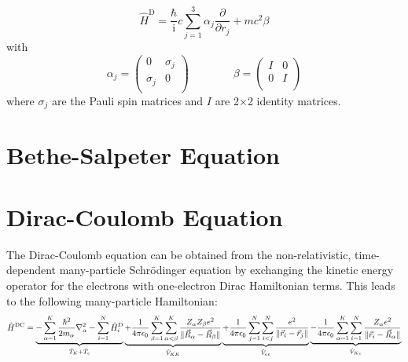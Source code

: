 \documentclass[9pt]{report}
\begin{document}
\begin{equation}
\hat{H}^{\mathrm{D}}=\frac{\hbar}{\mathrm{i}}c\sum_{j=1}^{3}\alpha_{j}\frac{\partial}{\partial r_j}+mc^2\beta
\end{equation}
with
\begin{equation}
\renewcommand{\arraystretch}{1.1}
\alpha_{j}=
\left(\begin{array}{cc}
0 & \sigma_j
\\
\sigma_j & 0
\\\end{array}\right)
\qquad\qquad
\beta =
\left(\begin{array}{cc}
I & 0
\\
0 & I
\\\end{array}\right)
\end{equation}
where $\sigma_j$ are the Pauli spin matrices and $I$ are 2$\times$2 identity matrices.


\section{Bethe-Salpeter Equation}








\section{Dirac-Coulomb Equation}
The Dirac-Coulomb equation can be obtained from the non-relativistic, time-dependent many-particle Schrödinger equation by exchanging the kinetic energy operator for the electrons with one-electron Dirac Hamiltonian terms. This leads to the following many-particle Hamiltonian:
\begin{equation}
\hat{H}^{\mathrm{DC}}=\underbrace{-\sum_{\alpha=1}^{K}\frac{\hbar^2}{2m_{\alpha}}\nabla_{\alpha}^2-\sum_{i=1}^{N}\hat{H}_{i}^{\mathrm{D}}}_{\hat{T}_K+\hat{T}_e}\underbrace{+\frac{1}{4\pi\epsilon_{0}}\sum_{\beta=1}^{K}\sum_{\alpha<\beta}^{K}\frac{Z_{\alpha}Z_{\beta}e^2}{\Vert\vec{R}_{\alpha}-\vec{R}_{\beta}\Vert}}_{\hat{V}_{KK}}\underbrace{+\frac{1}{4\pi\epsilon_{0}}\sum_{j=1}^{N}\sum_{i<j}^{N}\frac{e^2}{\Vert\vec{r}_{i}-\vec{r}_{j}\Vert}}_{\hat{V}_{ee}}\underbrace{-\frac{1}{4\pi\epsilon_{0}}\sum_{\alpha=1}^{K}\sum_{i=1}^{N}\frac{Z_{\alpha}e^2}{\Vert\vec{r}_{i}-\vec{R}_{\alpha}\Vert}}_{\hat{V}_{Ke}}\notag
\end{equation}
\end{document}
